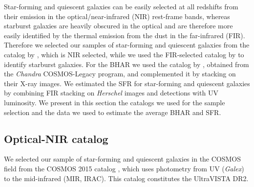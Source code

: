 Star-forming and quiescent galaxies can be easily selected at all redshifts from their emission in the optical/near-infrared (NIR) rest-frame bands, whereas starburst galaxies are heavily obscured in the optical and are therefore more easily identified by the thermal emission from the dust in the far-infrared (FIR). Therefore we selected our samples of star-forming and quiescent galaxies from the catalog by \citet{2016ApJS..224...24L}, which is NIR selected, while we used the FIR-selected catalog by \citet{2013MNRAS.432...23G} to identify starburst galaxies.
For the BHAR we used the catalog by \citet{2016ApJ...819...62C}, obtained from the \textit{Chandra} COSMOS-Legacy program, and complemented it by stacking on their X-ray images. 
We estimated the SFR for star-forming and quiescent galaxies by combining FIR stacking on \textit{Herschel} images and detections with UV luminosity.
We present in this section the catalogs we used for the sample selection and the data we used to estimate the average BHAR and SFR.

\subsection{Optical-NIR catalog}
We selected our sample of star-forming and quiescent galaxies in the COSMOS field \citep{2007ApJS..172....1S} from the COSMOS 2015 catalog \citep{2016ApJS..224...24L}, which uses photometry from UV (\textit{Galex}) to the mid-infrared (MIR, IRAC). This catalog constitutes the UltraVISTA DR2.

